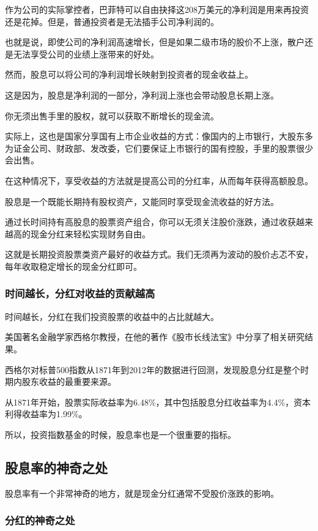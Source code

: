 作为公司的实际掌控者，巴菲特可以自由抉择这208万美元的净利润是用来再投资还是花掉。但是，普通投资者是无法插手公司净利润的。

也就是说，即使公司的净利润高速增长，但是如果二级市场的股价不上涨，散户还是无法享受公司的业绩上涨带来的好处。

然而，股息可以将公司的净利润增长映射到投资者的现金收益上。

这是因为，股息是净利润的一部分，净利润上涨也会带动股息长期上涨。

你无须出售手里的股权，就可以获取不断增长的现金流。

实际上，这也是国家分享国有上市企业收益的方式：像国内的上市银行，大股东多为证金公司、财政部、发改委，它们要保证上市银行的国有控股，手里的股票很少会出售。

在这种情况下，享受收益的方法就是提高公司的分红率，从而每年获得高额股息。

股息是一个既能长期持有股权资产，又能同时享受现金流收益的好方法。

通过长时间持有高股息的股票资产组合，你可以无须关注股价涨跌，通过收获越来越高的现金分红来轻松实现财务自由。

这就是长期投资股票类资产最好的收益方式。我们无须再为波动的股价忐忑不安，每年收取稳定增长的现金分红即可。

\subsubsection{时间越长，分红对收益的贡献越高}

时间越长，分红在我们投资股票的收益中的占比就越大。

美国著名金融学家西格尔教授，在他的著作《股市长线法宝》中分享了相关研究结果。

西格尔对标普500指数从1871年到2012年的数据进行回测，发现股息分红是整个时期内股东收益的最重要来源。

{\kaishu 从1871年开始，股票实际收益率为6.48\%，其中包括股息分红收益率为4.4\%，资本利得收益率为1.99\%。}

所以，投资指数基金的时候，股息率也是一个很重要的指标。

\subsection{股息率的神奇之处}
股息率有一个非常神奇的地方，就是现金分红通常不受股价涨跌的影响。

\subsubsection{分红的神奇之处}

